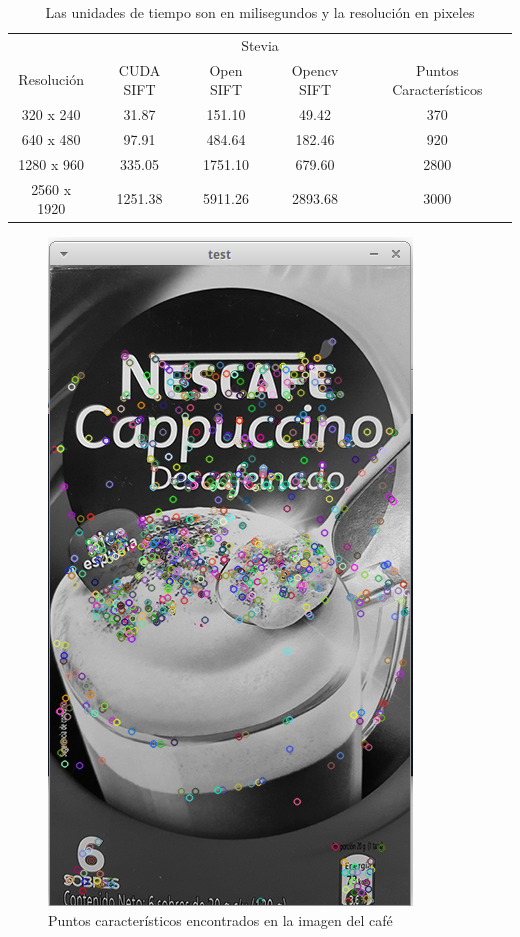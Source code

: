 \begin{table}[phtb]
\centering
\begin{tabular}{|c|c|c|c|c|}
\hline

\multicolumn{5}{|c|}{Stevia} \\
\cline{1-5}
Resolución & CUDA SIFT & Open SIFT & Opencv SIFT & Puntos Característicos\\
\hline \hline
 320 x 240  & 31.87   &   151.10  &  49.42   & 370\\ \cline{1-5}
 640 x 480  & 97.91   &   484.64  &  182.46  & 920\\ \cline{1-5}
1280 x 960  & 335.05  &  1751.10  &  679.60  & 2800\\ \cline{1-5}
2560 x 1920 & 1251.38 &  5911.26  &  2893.68 & 3000\\ \cline{1-5}

\end{tabular}
\caption{Las unidades de tiempo son en milisegundos y la resolución en pixeles}
\label{tabla:final}
\end{table}


\begin{figure}[ph]
			\centering
				\includegraphics[scale=0.75]{img/cafe.png}
			\caption{Puntos característicos encontrados en la imagen del café}
\end{figure}

